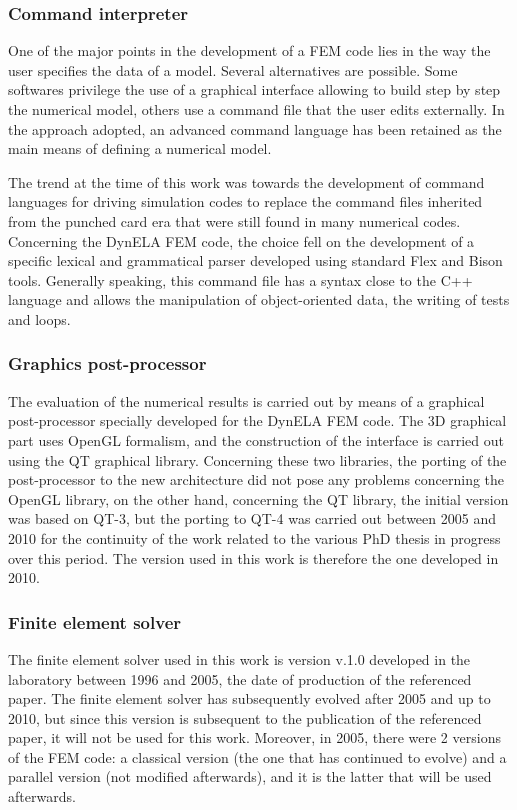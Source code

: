 \documentclass{article}
\begin{document}
\subsubsection{Command interpreter}
One of the major points in the development of a FEM code lies in the way the user specifies the data of a model. Several alternatives are possible. Some softwares privilege the use of a graphical interface allowing to build step by step the numerical model, others use a command file that the user edits externally. In the approach adopted, an advanced command language has been retained as the main means of defining a numerical model. 

The trend at the time of this work was towards the development of command languages for driving simulation codes to replace the command files inherited from the punched card era that were still found in many numerical codes. Concerning the DynELA FEM code, the choice fell on the development of a specific lexical and grammatical parser developed using standard Flex and Bison tools. Generally speaking, this command file has a syntax close to the C++ language and allows the manipulation of object-oriented data, the writing of tests and loops. 
 
\subsubsection{Graphics post-processor}

The evaluation of the numerical results is carried out by means of a graphical post-processor specially developed for the DynELA FEM code. The 3D graphical part uses OpenGL formalism, and the construction of the interface is carried out using the QT graphical library. Concerning these two libraries, the porting of the post-processor to the new architecture did not pose any problems concerning the OpenGL library, on the other hand, concerning the QT library, the initial version was based on QT-3, but the porting to QT-4 was carried out between 2005 and 2010 for the continuity of the work related to the various PhD thesis in progress over this period. The version used in this work is therefore the one developed in 2010.

\subsubsection{Finite element solver}

The finite element solver used in this work is version v.1.0 developed in the laboratory between 1996 and 2005, the date of production of the referenced paper. The finite element solver has subsequently evolved after 2005 and up to 2010, but since this version is subsequent to the publication of the referenced paper, it will not be used for this work. Moreover, in 2005, there were 2 versions of the FEM code: a classical version (the one that has continued to evolve) and a parallel version (not modified afterwards), and it is the latter that will be used afterwards.
\end{document}
